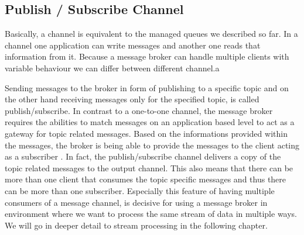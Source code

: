 \subsection{Publish / Subscribe Channel} 
Basically, a channel is equivalent to the managed queues we described so far. In
a channel one application can write messages and another one reads that
information from it. Because a message broker can handle multiple clients with
variable behaviour we can differ between different channel.a

Sending messages to the broker in form of publishing to a specific topic and on
the other hand receiving messages only for the specified topic, is called
publish/subscribe. In contrast to a one-to-one channel, the message broker
requires the abilities to match messages on an application based level to act as
a gateway for topic related messages. Based on the informations provided within
the messages, the broker is being able to provide the messages to the client
acting as a subscriber \cite{TAN06}. In fact, the publish/subscribe channel
delivers a copy of the topic related messages to the output channel. This also
means that there can be more than one client that consumes the topic specific
messages and thus there can be more than one subscriber. Especially this feature
of having multiple consumers of a message channel, is decisive for using a
message broker in environment where we want to process the same stream of
data in multiple ways. We will go in deeper detail to stream processing in the
following chapter. \cite{EIP03}


